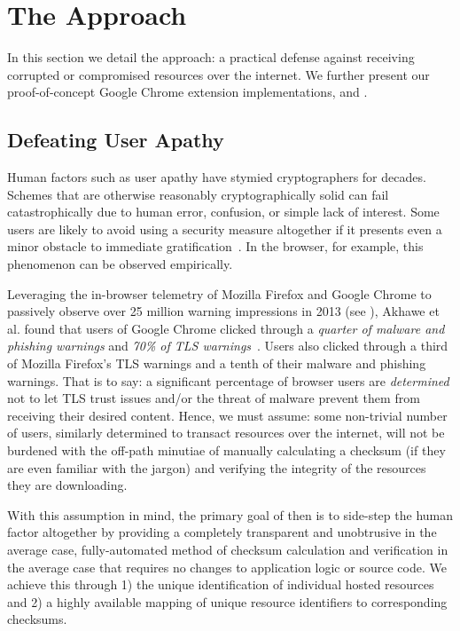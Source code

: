 \section{The \SYSTEM{} Approach} \label{sec:approach}

In this section we detail the \SYSTEM{} approach: a practical defense against
receiving corrupted or compromised resources over the internet. We further
present our proof-of-concept Google Chrome extension implementations, \DNSSYS{}
and \DHTSYS{}.

\subsection{Defeating User Apathy}

Human factors such as user apathy have stymied cryptographers for decades.
Schemes that are otherwise reasonably cryptographically solid can fail
catastrophically due to human error, confusion, or simple lack of interest. Some
users are likely to avoid using a security measure altogether if it presents
even a minor obstacle to immediate gratification~\cite{Clickthrough, PGPBad}. In
the browser, for example, this phenomenon can be observed empirically.

Leveraging the in-browser telemetry of Mozilla Firefox and Google Chrome to
passively observe over 25 million warning impressions in 2013 (see
), Akhawe et al. found that users of Google Chrome clicked
through a \emph{quarter of malware and phishing warnings} and \emph{70\% of TLS
warnings}~\cite{Clickthrough}. Users also clicked through a third of Mozilla
Firefox's TLS warnings and a tenth of their malware and phishing warnings. That
is to say: a significant percentage of browser users are \emph{determined} not
to let TLS trust issues and/or the threat of malware prevent them from receiving
their desired content. Hence, we must assume: some non-trivial number of users,
similarly determined to transact resources over the internet, will not be
burdened with the off-path minutiae of manually calculating a checksum (if they
are even familiar with the jargon) and verifying the integrity of the resources
they are downloading.

With this assumption in mind, the primary goal of \SYSTEM{} then is to side-step
the human factor altogether by providing a completely transparent and
unobtrusive in the average case, fully-automated method of checksum calculation
and verification in the average case that requires no changes to application
logic or source code. We achieve this through 1) the unique identification of
individual hosted resources and 2) a highly available mapping of unique resource
identifiers to corresponding checksums.

